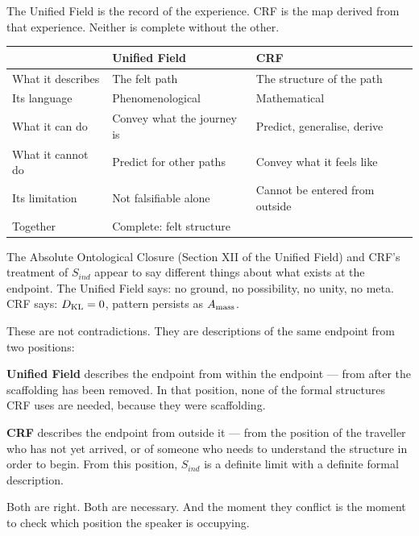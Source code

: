 \documentclass[12pt, a4paper]{article}
\begin{document}
The Unified Field is the record of the experience. CRF is the map derived
from that experience. Neither is complete without the other.

\begin{keybox}[title={The Complete Description Requires Both}]
\begin{center}
\renewcommand{\arraystretch}{1.4}
\begin{tabular}{p{4cm} p{4.5cm} p{4cm}}
\toprule
& \textbf{Unified Field} & \textbf{CRF} \\
\midrule
What it describes & The felt path & The structure of the path \\
Its language & Phenomenological & Mathematical \\
What it can do & Convey what the journey is & Predict, generalise, derive \\
What it cannot do & Predict for other paths & Convey what it feels like \\
Its limitation & Not falsifiable alone & Cannot be entered from outside \\
Together & Complete: felt structure & \\
\bottomrule
\end{tabular}
\end{center}
\end{keybox}

The Absolute Ontological Closure (Section XII of the Unified Field) and
CRF's treatment of $S_{ind}$ appear to say different things about what
exists at the endpoint. The Unified Field says: no ground, no possibility,
no unity, no meta. CRF says: $D_{\rm KL} = 0$, pattern persists as $A_{\rm mass}$.

These are not contradictions. They are descriptions of the same endpoint
from two positions:

\textbf{Unified Field} describes the endpoint from within the endpoint ---
from after the scaffolding has been removed. In that position, none of
the formal structures CRF uses are needed, because they were scaffolding.

\textbf{CRF} describes the endpoint from outside it --- from the position
of the traveller who has not yet arrived, or of someone who needs to
understand the structure in order to begin. From this position, $S_{ind}$
is a definite limit with a definite formal description.

Both are right. Both are necessary. And the moment they conflict is the
moment to check which position the speaker is occupying.
\end{document}
